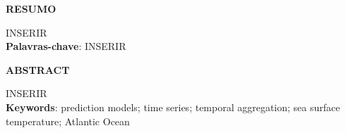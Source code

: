 \documentclass[12pt]{report} %
\begin{document}
	\pagebreak
	
	
	\begin{center}
		{\fontsize{16pt}{\baselineskip}\selectfont \textbf{RESUMO}}\\[2em]
	\end{center}
	
	\justifying 
	\noindent
	INSERIR
	\\[3em]
	
	\normalsize\noindent
	\textbf{Palavras-chave}: INSERIR
	
	\pagebreak
	
	
	\begin{center}
		{\fontsize{16pt}{\baselineskip}\selectfont \textbf{ABSTRACT}}\\[2em]
	\end{center}
	
	\justifying
	\noindent
	INSERIR
	\\[3em]
	
	\normalsize\noindent
	\textbf{Keywords}: prediction models; time series; temporal aggregation; sea surface temperature; Atlantic Ocean
	
	
	\pagebreak
	
	
	\renewcommand{\cftdot}{}
	\tableofcontents %
	
	\pagebreak
	
	
	\listoffigures
	
	\pagebreak
	
	
\end{document}
